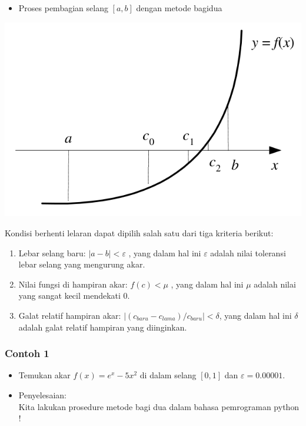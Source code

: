 \documentclass[pdflatex,compress]{beamer}
\begin{document}
\begin{frame}
	\begin{itemize}
		\item Proses pembagian selang $ [a, b] $ dengan metode bagidua
	\end{itemize}
	\begin{center}
		\includegraphics[width=0.7\linewidth]{img/img06.png}
	\end{center}
\end{frame}

\begin{frame}
	Kondisi berhenti lelaran dapat dipilih salah satu dari tiga kriteria berikut:
	\begin{enumerate}
		\item Lebar selang baru: $|a - b| < \varepsilon$ , yang dalam hal ini $\varepsilon$ adalah nilai toleransi lebar selang yang mengurung akar.
		\item Nilai fungsi di hampiran akar: $ f(c) < \mu $ , yang dalam hal ini $\mu$ adalah nilai yang sangat kecil mendekati 0.
		\item Galat relatif hampiran akar: $ |(c_{baru} - c_{lama}) / c_{baru}| < \delta $, yang dalam hal ini $\delta$ adalah galat relatif hampiran yang diinginkan.
	\end{enumerate}
\end{frame}

\begin{frame}
	\frametitle{Contoh 1}
	\begin{itemize}
		\item Temukan akar $ f(x) = e^x - 5x^2 $ di dalam selang $ [0, 1] $ dan $ \varepsilon = 0.00001 $.
		\item Penyelesaian:\\Kita lakukan prosedure metode bagi dua dalam bahasa pemrograman python !
	\end{itemize}
\end{frame}
\end{document}
